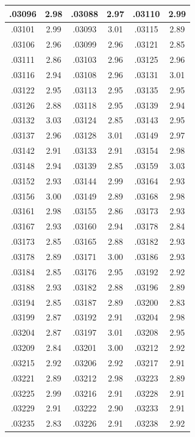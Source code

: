 \documentclass[10pt,twoside]{report}
\begin{document}
\begin{appendices}
\begin{longtable}{|c|c||c|c||c|c|}
.03096 & 2.98 & .03088 & 2.97 & .03110 & 2.99\\\hline
.03101 & 2.99 & .03093 & 3.01 & .03115 & 2.89\\\hline
.03106 & 2.96 & .03099 & 2.96 & .03121 & 2.85\\\hline
.03111 & 2.86 & .03103 & 2.96 & .03125 & 2.96\\\hline
.03116 & 2.94 & .03108 & 2.96 & .03131 & 3.01\\\hline
.03122 & 2.95 & .03113 & 2.95 & .03135 & 2.95\\\hline
.03126 & 2.88 & .03118 & 2.95 & .03139 & 2.94\\\hline
.03132 & 3.03 & .03124 & 2.85 & .03143 & 2.95\\\hline
.03137 & 2.96 & .03128 & 3.01 & .03149 & 2.97\\\hline
.03142 & 2.91 & .03133 & 2.91 & .03154 & 2.98\\\hline
.03148 & 2.94 & .03139 & 2.85 & .03159 & 3.03\\\hline
.03152 & 2.93 & .03144 & 2.99 & .03164 & 2.93\\\hline
.03156 & 3.00 & .03149 & 2.89 & .03168 & 2.98\\\hline
.03161 & 2.98 & .03155 & 2.86 & .03173 & 2.93\\\hline
.03167 & 2.93 & .03160 & 2.94 & .03178 & 2.84\\\hline
.03173 & 2.85 & .03165 & 2.88 & .03182 & 2.93\\\hline
.03178 & 2.89 & .03171 & 3.00 & .03186 & 2.93\\\hline
.03184 & 2.85 & .03176 & 2.95 & .03192 & 2.92\\\hline
.03188 & 2.93 & .03182 & 2.88 & .03196 & 2.89\\\hline
.03194 & 2.85 & .03187 & 2.89 & .03200 & 2.83\\\hline
.03199 & 2.87 & .03192 & 2.91 & .03204 & 2.98\\\hline
.03204 & 2.87 & .03197 & 3.01 & .03208 & 2.95\\\hline
.03209 & 2.84 & .03201 & 3.00 & .03212 & 2.92\\\hline
.03215 & 2.92 & .03206 & 2.92 & .03217 & 2.91\\\hline
.03221 & 2.89 & .03212 & 2.98 & .03223 & 2.89\\\hline
.03225 & 2.99 & .03216 & 2.91 & .03228 & 2.91\\\hline
.03229 & 2.91 & .03222 & 2.90 & .03233 & 2.91\\\hline
.03235 & 2.83 & .03226 & 2.91 & .03238 & 2.92\\\hline

\end{longtable}
\end{appendices}
\end{document}
